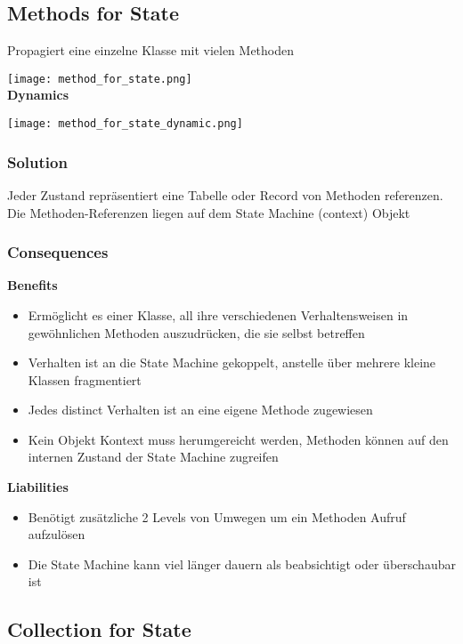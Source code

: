 \vfill\null
\columnbreak

\subsection{Methods for State}

Propagiert eine einzelne Klasse mit vielen Methoden

\texttt{[image: method\_for\_state.png]} \\

\textbf{Dynamics}

\texttt{[image: method\_for\_state\_dynamic.png]}

\subsubsection{Solution}

Jeder Zustand repräsentiert eine Tabelle oder Record von Methoden referenzen. Die Methoden-Referenzen liegen auf dem State Machine (context) Objekt

\subsubsection{Consequences}
\textbf{Benefits}
\begin{itemize}
    \item Ermöglicht es einer Klasse, all ihre verschiedenen Verhaltensweisen in gewöhnlichen Methoden auszudrücken, die sie selbst betreffen
    \item Verhalten ist an die State Machine gekoppelt, anstelle über mehrere kleine Klassen fragmentiert
    \item Jedes distinct Verhalten ist an eine eigene Methode zugewiesen
    \item Kein Objekt Kontext muss herumgereicht werden, Methoden können auf den internen Zustand der State Machine zugreifen
\end{itemize}
\vspace{10pt}
\textbf{Liabilities}
\begin{itemize}
    \item Benötigt zusätzliche 2 Levels von Umwegen um ein Methoden Aufruf aufzulösen
    \item Die State Machine kann viel länger dauern als beabsichtigt oder überschaubar ist
\end{itemize}

\vfill\null
\columnbreak

\subsection{Collection for State}


